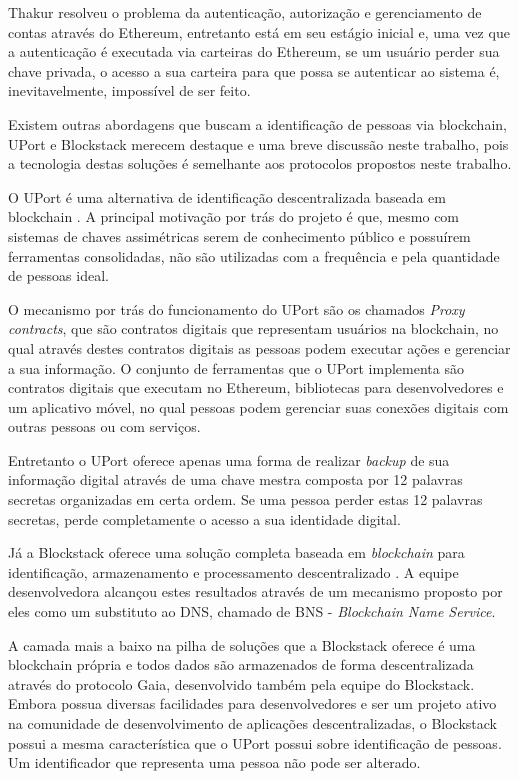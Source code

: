 \documentclass[tcc,capa]{texufpel}
\begin{document}
    Thakur resolveu o problema da autenticação, autorização e gerenciamento de contas através do Ethereum, entretanto está em seu estágio inicial e, uma vez que a autenticação é executada via carteiras do Ethereum, se um usuário perder sua chave privada, o acesso a sua carteira para que possa se autenticar ao sistema é, inevitavelmente, impossível de ser feito.
    
    Existem outras abordagens que buscam a identificação de pessoas via blockchain, UPort e Blockstack merecem destaque e uma breve discussão neste trabalho, pois a tecnologia destas soluções é semelhante aos protocolos propostos neste trabalho.
    
    O UPort é uma alternativa de identificação descentralizada baseada em blockchain \cite{lundkvist2017uport}. A principal motivação por trás do projeto é que, mesmo com sistemas de chaves assimétricas serem de conhecimento público e possuírem ferramentas consolidadas, não são utilizadas com a frequência e pela quantidade de pessoas ideal.
    
    O mecanismo por trás do funcionamento do UPort são os chamados \textit{Proxy contracts}, que são contratos digitais que representam usuários na blockchain, no qual através destes contratos digitais as pessoas podem executar ações e gerenciar a sua informação. O conjunto de ferramentas que o UPort implementa são contratos digitais que executam no Ethereum, bibliotecas para desenvolvedores e um aplicativo móvel, no qual pessoas podem gerenciar suas conexões digitais com outras pessoas ou com serviços.
    
    Entretanto o UPort oferece apenas uma forma de realizar \textit{backup} de sua informação digital através de uma chave mestra composta por 12 palavras secretas organizadas em certa ordem. Se uma pessoa perder estas 12 palavras secretas, perde completamente o acesso a sua identidade digital.
    
    Já a Blockstack oferece uma solução completa baseada em \textit{blockchain} para identificação, armazenamento e processamento descentralizado \cite{ali2016blockstack}. A equipe desenvolvedora alcançou estes resultados através de um mecanismo proposto por eles como um substituto ao DNS, chamado de BNS - \textit{Blockchain Name Service}.
    
    A camada mais a baixo na pilha de soluções que a Blockstack oferece é uma blockchain própria e todos dados são armazenados de forma descentralizada através do protocolo Gaia, desenvolvido também pela equipe do Blockstack. Embora possua diversas facilidades para desenvolvedores e ser um projeto ativo na comunidade de desenvolvimento de aplicações descentralizadas, o Blockstack possui a mesma característica que o UPort possui sobre identificação de pessoas. Um identificador que representa uma pessoa não pode ser alterado.
    
\end{document}
